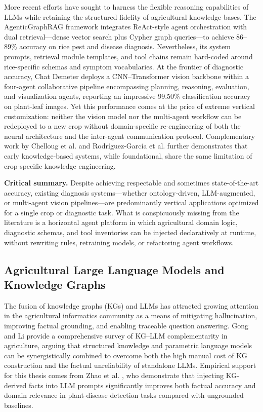 More recent efforts have sought to harness the flexible reasoning capabilities of LLMs while retaining the structured fidelity of agricultural knowledge bases. The AgenticGraphRAG framework \cite{agenticgraphrag2025} integrates ReAct-style agent orchestration with dual retrieval---dense vector search plus Cypher graph queries---to achieve 86--89\% accuracy on rice pest and disease diagnosis. Nevertheless, its system prompts, retrieval module templates, and tool chains remain hard-coded around rice-specific schemas and symptom vocabularies. At the frontier of diagnostic accuracy, Chat Demeter \cite{chatdemeter2025} deploys a CNN--Transformer vision backbone within a four-agent collaborative pipeline encompassing planning, reasoning, evaluation, and visualization agents, reporting an impressive 99.50\% classification accuracy on plant-leaf images. Yet this performance comes at the price of extreme vertical customization: neither the vision model nor the multi-agent workflow can be redeployed to a new crop without domain-specific re-engineering of both the neural architecture and the inter-agent communication protocol. Complementary work by Chelloug et al. \cite{chelloug2023mdtwlstm} and Rodr{\'i}guez-Garc{\'i}a et al. \cite{rodriguez2021kbs} further demonstrates that early knowledge-based systems, while foundational, share the same limitation of crop-specific knowledge engineering.

\textbf{Critical summary.} Despite achieving respectable and sometimes state-of-the-art accuracy, existing diagnosis systems---whether ontology-driven, LLM-augmented, or multi-agent vision pipelines---are predominantly vertical applications optimized for a single crop or diagnostic task. What is conspicuously missing from the literature is a horizontal agent platform in which agricultural domain logic, diagnostic schemas, and tool inventories can be injected declaratively at runtime, without rewriting rules, retraining models, or refactoring agent workflows.

\subsection{Agricultural Large Language Models and Knowledge Graphs}

The fusion of knowledge graphs (KGs) and LLMs has attracted growing attention in the agricultural informatics community as a means of mitigating hallucination, improving factual grounding, and enabling traceable question answering. Gong and Li \cite{gong2025kgllm} provide a comprehensive survey of KG--LLM complementarity in agriculture, arguing that structured knowledge and parametric language models can be synergistically combined to overcome both the high manual cost of KG construction and the factual unreliability of standalone LLMs. Empirical support for this thesis comes from Zhao et al. \cite{zhao2024llmkgagriculture}, who demonstrate that injecting KG-derived facts into LLM prompts significantly improves both factual accuracy and domain relevance in plant-disease detection tasks compared with ungrounded baselines.

